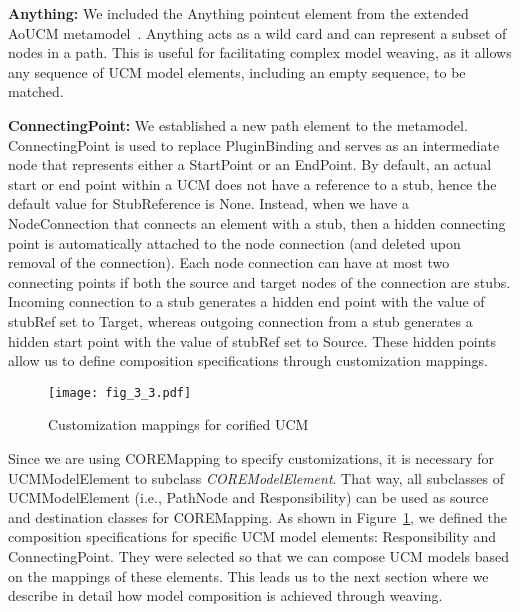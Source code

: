 \textbf{\cls Anything:} We included the {\cls Anything} pointcut element from the extended AoUCM metamodel~\cite{mussbacher2011aspect}. {\cls Anything} acts as a wild card and can represent a subset of nodes in a path. This is useful for facilitating complex model weaving, as it allows any sequence of UCM model elements, including an empty sequence, to be matched.

\textbf{\cls ConnectingPoint:} We established a new path element to the metamodel. {\cls ConnectingPoint} is used to replace {\cls PluginBinding} and serves as an intermediate node that represents either a {\cls StartPoint} or an {\cls EndPoint}. By default, an actual start or end point within a UCM does not have a reference to a stub, hence the default value for {\cls StubReference} is {\cls None}. Instead, when we have a {\cls NodeConnection} that connects an element with a stub, then a hidden connecting point is automatically attached to the node connection (and deleted upon removal of the connection). Each node connection can have at most two connecting points if both the source and target nodes of the connection are stubs. Incoming connection to a stub generates a hidden end point with the value of {\cls stubRef} set to {\cls Target}, whereas outgoing connection from a stub generates a hidden start point with the value of {\cls stubRef} set to {\cls Source}. These hidden points allow us to define composition specifications through customization mappings.

\begin{figure}
	\centering
	\texttt{[image: fig\_3\_3.pdf]}
	\caption{Customization mappings for corified UCM}
	\label{fig:3.3}
\end{figure}

Since we are using {\cls COREMapping} to specify customizations, it is necessary for {\cls UCMModelElement} to subclass \emph{\cls COREModelElement}. That way, all subclasses of {\cls UCMModelElement} (i.e., {\cls PathNode} and {\cls Responsibility}) can be used as source and destination classes for {\cls COREMapping}. As shown in Figure~\ref{fig:3.3}, we defined the composition specifications for specific UCM model elements: {\cls Responsibility} and {\cls ConnectingPoint}. They were selected so that we can compose UCM models based on the mappings of these elements. This leads us to the next section where we describe in detail how model composition is achieved through weaving.

